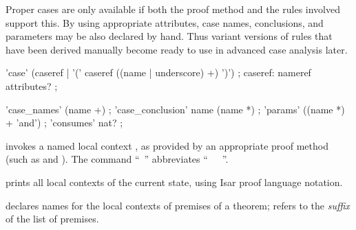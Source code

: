 \begin{isabellebody}
\begin{isamarkuptext}
  \medskip Proper cases are only available if both the proof method
  and the rules involved support this.  By using appropriate
  attributes, case names, conclusions, and parameters may be also
  declared by hand.  Thus variant versions of rules that have been
  derived manually become ready to use in advanced case analysis
  later.

  \begin{rail}
    'case' (caseref | '(' caseref ((name | underscore) +) ')')
    ;
    caseref: nameref attributes?
    ;

    'case\_names' (name +)
    ;
    'case\_conclusion' name (name *)
    ;
    'params' ((name *) + 'and')
    ;
    'consumes' nat?
    ;
  \end{rail}

  \begin{descr}
  
  \item [\mbox{\isa{\isacommand{case}}}~\isa{{\isachardoublequote}{\isacharparenleft}c\ x\isactrlsub {\isadigit{1}}\ {\isasymdots}\ x\isactrlsub m{\isacharparenright}{\isachardoublequote}}]
  invokes a named local context , as provided by an appropriate
  proof method (such as \mbox{} and \mbox{}).
  The command ``\mbox{}~'' abbreviates ``\mbox{}~~\mbox{}~''.

  \item [\mbox{\isa{\isacommand{print{\isacharunderscore}cases}}}] prints all local contexts of the
  current state, using Isar proof language notation.
  
  \item [\mbox{\isa{case{\isacharunderscore}names}}~\isa{{\isachardoublequote}c\isactrlsub {\isadigit{1}}\ {\isasymdots}\ c\isactrlsub k{\isachardoublequote}}]
  declares names for the local contexts of premises of a theorem;
   refers to the \emph{suffix} of the
  list of premises.
  

\end{descr}
\end{isamarkuptext}
\end{isabellebody}
